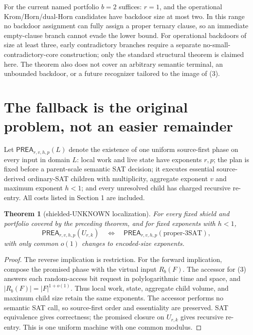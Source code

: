 \documentclass[11pt]{article}
\newtheorem{theorem}{Theorem}
\newcommand{\PREA}{\mathsf{PREA}}
\begin{document}
For the current named portfolio $b=2$ suffices: $r=1$, and the operational
Krom/Horn/dual-Horn candidates have backdoor size at most two.  In this range
no backdoor assignment can fully assign a proper ternary clause, so an
immediate empty-clause branch cannot evade the lower bound.  For operational
backdoors of size at least three, early contradictory branches require a
separate no-small-contradictory-core construction; only the standard
structural theorem is claimed here.  The theorem also does not cover an
arbitrary semantic terminal, an unbounded backdoor, or a future recognizer
tailored to the image of (3).

\section{The fallback is the original problem, not an easier remainder}

Let $\PREA_{r,v,h,p}(L)$ denote the existence of one uniform source-first
phase on every input in domain $L$: local work and live state have exponents
$r,p$; the plan is fixed before a parent-scale semantic SAT decision; it
executes essential source-derived ordinary-SAT children with multiplicity,
aggregate exponent $v$ and maximum exponent $h<1$; and every unresolved
child has charged recursive re-entry.  All costs listed in Section 1 are
included.

\begin{theorem}[shielded-UNKNOWN localization]
For every fixed shield and portfolio covered by the preceding theorem, and
for fixed exponents with $h<1$,
\[
 \PREA_{r,v,h,p}(U_{r,k})
 \quad\Longleftrightarrow\quad
 \PREA_{r,v,h,p}(\text{proper-3SAT}),               \tag{7}
\]
with only common $o(1)$ changes to encoded-size exponents.
\end{theorem}
\begin{proof}
The reverse implication is restriction.  For the forward implication,
compose the promised phase with the virtual input $R_b(F)$.  The accessor for
(3) answers each random-access bit request in polylogarithmic time and space,
and $|R_b(F)|=|F|^{1+o(1)}$.  Thus local work, state, aggregate child volume,
and maximum child size retain the same exponents.  The accessor performs no
semantic SAT call, so source-first order and essentiality are preserved.
SAT equivalence gives correctness; the promised closure on $U_{r,k}$ gives
recursive re-entry.  This is one uniform machine with one common modulus.
\end{proof}
\end{document}
